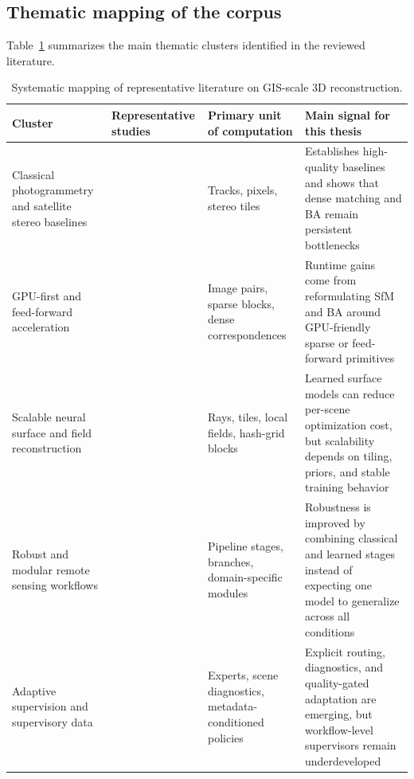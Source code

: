 \subsection{Thematic mapping of the corpus}

Table~\ref{tab:litmap-summary} summarizes the main thematic clusters identified in the reviewed literature.

\begin{table}[ht]
\centering
\caption{Systematic mapping of representative literature on GIS-scale 3D reconstruction.}
\small
\begin{tabular}{p{}p{}p{}p{}}
\hline
\textbf{Cluster} & \textbf{Representative studies} & \textbf{Primary unit of computation} & \textbf{Main signal for this thesis} \\
\hline
Classical photogrammetry and satellite stereo baselines & \cite{Schonberger2016,Schonberger2016MVS,Galliani2015,deFranchis2014} & Tracks, pixels, stereo tiles & Establishes high-quality baselines and shows that dense matching and BA remain persistent bottlenecks \\
GPU-first and feed-forward acceleration & \cite{Li2025FastMap,Zhong2025InstantSfM,Yu2025CuSfM,Safari2025,Gopinath2025,Light3RSfM2025,DenseSfM2025} & Image pairs, sparse blocks, dense correspondences & Runtime gains come from reformulating SfM and BA around GPU-friendly sparse or feed-forward primitives \\
Scalable neural surface and field reconstruction & \cite{SatDN2025,ShadowGS2026,SnakeNeRF2025,BirdNeRF2025} & Rays, tiles, local fields, hash-grid blocks & Learned surface models can reduce per-scene optimization cost, but scalability depends on tiling, priors, and stable training behavior \\
Robust and modular remote sensing workflows & \cite{Amadei2025,Masquil2026,FoundationStereo2025,MVSR3D2025,Planet4Stereo2025} & Pipeline stages, branches, domain-specific modules & Robustness is improved by combining classical and learned stages instead of expecting one model to generalize across all conditions \\
Adaptive supervision and supervisory data & \cite{SMoEStereo2025,MoE3D2026,SatDepth2025,SEO2025,Elias2025} & Experts, scene diagnostics, metadata-conditioned policies & Explicit routing, diagnostics, and quality-gated adaptation are emerging, but workflow-level supervisors remain underdeveloped \\
\hline
\end{tabular}
\label{tab:litmap-summary}
\end{table}

